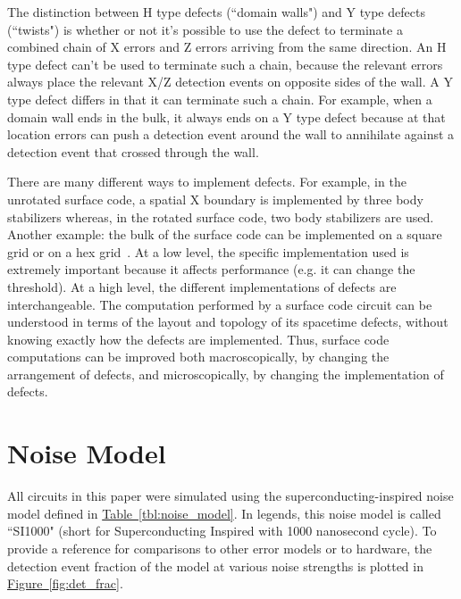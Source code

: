 \documentclass[onecolumn,unpublished,a4paper]{quantumarticle}
\theoremstyle{definition}
\theoremstyle{definition}
\theoremstyle{definition}
\newcommand{\fig}[1]{\hyperref[fig:#1]{Figure~\ref*{fig:#1}}}
\newcommand{\tbl}[1]{\hyperref[tbl:#1]{Table~\ref*{tbl:#1}}}
\begin{document}
The distinction between H type defects (``domain walls") and Y type defects (``twists") is whether or not it's possible to use the defect to terminate a combined chain of X errors and Z errors arriving from the same direction.
An H type defect can't be used to terminate such a chain, because the relevant errors always place the relevant X/Z detection events on opposite sides of the wall.
A Y type defect differs in that it can terminate such a chain.
For example, when a domain wall ends in the bulk, it always ends on a Y type defect because at that location errors can push a detection event around the wall to annihilate against a detection event that crossed through the wall.

There are many different ways to implement defects.
For example, in the unrotated surface code, a spatial X boundary is implemented by three body stabilizers whereas, in the rotated surface code, two body stabilizers are used.
Another example: the bulk of the surface code can be implemented on a square grid or on a hex grid~\cite{mcewenmidoutsurfaces2023}.
At a low level, the specific implementation used is extremely important because it affects performance (e.g. it can change the threshold).
At a high level, the different implementations of defects are interchangeable.
The computation performed by a surface code circuit can be understood in terms of the layout and topology of its spacetime defects, without knowing exactly how the defects are implemented.
Thus, surface code computations can be improved both macroscopically, by changing the arrangement of defects, and microscopically, by changing the implementation of defects.

\section{Noise Model}
\label{app:noise_model}

All circuits in this paper were simulated using the superconducting-inspired noise model defined in \tbl{noise_model}.
In legends, this noise model is called ``SI1000" (short for Superconducting Inspired with 1000 nanosecond cycle).
To provide a reference for comparisons to other error models or to hardware, the detection event fraction of the model at various noise strengths is plotted in \fig{det_frac}.
\end{document}
